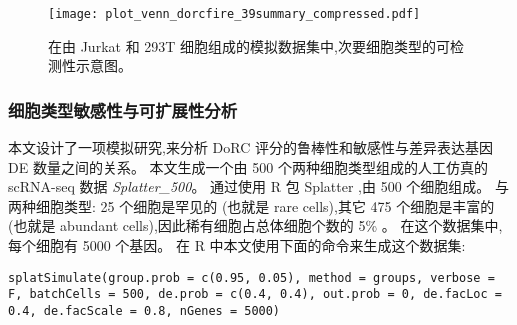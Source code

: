 \begin{figure}[!htbp]
    \centering
    \texttt{[image: plot\_venn\_dorcfire\_39summary\_compressed.pdf]}
    \caption{
    在由 Jurkat 和 293T 细胞组成的模拟数据集中,次要细胞类型的可检测性示意图。
    }
    \label{fig:jurkat}
\end{figure}

\subsubsection{细胞类型敏感性与可扩展性分析}


本文设计了一项模拟研究,来分析 DoRC 评分的鲁棒性和敏感性与差异表达基因 DE 数量之间的关系。
本文生成一个由 500 个两种细胞类型组成的人工仿真的 scRNA-seq 数据 \textit{Splatter\_500}。
通过使用 R 包 Splatter ,由 500 个细胞组成。
与两种细胞类型: 25 个细胞是罕见的 (也就是 rare cells),其它 475 个细胞是丰富的 (也就是 abundant cells),因此稀有细胞占总体细胞个数的 5\% 。
在这个数据集中,每个细胞有 5000 个基因。
在 R 中本文使用下面的命令来生成这个数据集:

\texttt{splatSimulate(group.prob = c(0.95, 0.05), method = groups, 
verbose = F, batchCells = 500, de.prob = c(0.4, 0.4), out.prob = 0, 
de.facLoc = 0.4, de.facScale = 0.8, nGenes = 5000)}

